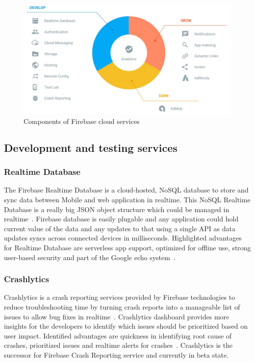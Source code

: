 \begin{figure}[!ht]
	\centering\includegraphics[width=\columnwidth]{../images/firebase.JPG}
	\caption{ Components of Firebase cloud services 
		\cite{hid-sp18-409-www-firebase}}
	\label{fig:firebase}
\end{figure}

\subsection{Development and testing services}

\subsubsection{Realtime Database}
The Firebase Realtime Database is a cloud-hosted, NoSQL database to store and 
sync data between Mobile and web application in realtime. This NoSQL Realtime 
Database is a really big JSON object structure which could be managed in 
realtime~\cite{hid-sp18-409-www-firebase-wikipedia, 
	hid-sp18-409-www-firebase-products}. Firebase database is easily plugable 
	and 
any application could hold current value of the data and any updates to that 
using a single API as data updates syncs across connected devices in 
milliseconds. Highlighted advantages for Realtime Database are serverless app 
support, optimized for offline use, strong user-based security and part of the 
Google echo system~\cite{hid-sp18-409-www-firebase-products}.

\subsubsection{Crashlytics}
Crashlytics is a crash reporting services provided by Firebase technologies to 
reduce troubleshooting time by turning crash reports into a manageable list of 
issues to allow bug fixes in 
realtime~\cite{hid-sp18-409-www-firebase-products}. Crashlytics dashboard 
provides more insights for the developers to identify which issues should be 
prioritized based on user impact. Identified advantages are quickness in 
identifying root cause of crashes, prioritized issues and realtime alerts for 
crashes~\cite{hid-sp18-409-www-firebase-products}. Crashlytics is the successor 
for Firebase Crash Reporting service and currently in beta state.

